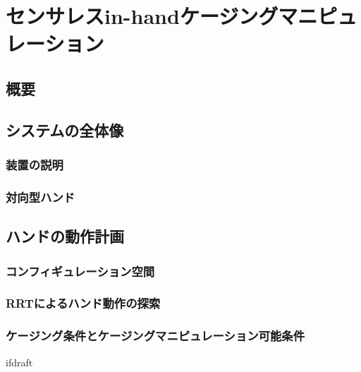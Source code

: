 \documentclass[a4paper,twoside,12pt,papersize, dvipdfmx]{iirthesis}
\begin{document}
    \newcommand{\figref}[1]{\figurename\ref{#1}}
    \newcommand{\tabref}[1]{\tablename\ref{#1}}
    \renewcommand{\eqref}[1]{式~(\ref{#1})}
    \newcommand{\chapref}[1]{\ref{#1}章}
    \newcommand{\secref}[1]{\ref{#1}節}
    \newcommand{\ssecref}[1]{\ref{#1}項}
    \newcommand{\appref}[1]{付録\ref{#1}}
\fi


\chapter{センサレスin-handケージングマニピュレーション}\label{chap::sicm}
\minitoc

\section{概要}

\section{システムの全体像}\label{sec::sicm::overall}
\subsection{装置の説明}\label{subsec::sicm::equipment}
\subsection{対向型ハンド}\label{subsec::sicm::oppositehand}

\section{ハンドの動作計画}\label{sec::scim::planning}
\subsection{コンフィギュレーション空間}\label{subsec::sicm::cspace}
\subsection{RRTによるハンド動作の探索}\label{subsec::sicm::rrt}
\subsection{ケージング条件とケージングマニピュレーション可能条件}\label{subsec::sicm::caging}



\expandafter\ifx\csname ifdraft\endcsname\relax
    
\end{document}

